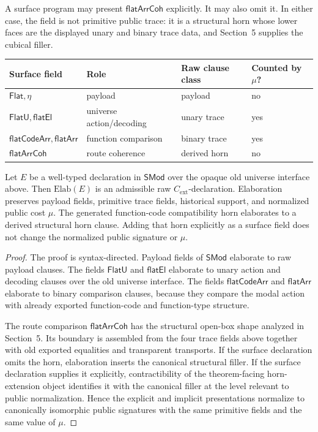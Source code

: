 A surface program may present \(\mathsf{flatArrCoh}\) explicitly.  It may also omit it.  In
either case, the field is not primitive public trace: it is a structural horn whose lower faces
are the displayed unary and binary trace data, and Section~5 supplies the cubical filler.

\begin{center}
\begin{tabular}{llll}
\hline
Surface field & Role & Raw clause class & Counted by \(\mu\)? \\
\hline
\(\mathsf{Flat},\eta\) & payload & payload & no \\
\(\mathsf{FlatU},\mathsf{flatEl}\) & universe action/decoding & unary trace & yes \\
\(\mathsf{flatCodeArr},\mathsf{flatArr}\) & function comparison & binary trace & yes \\
\(\mathsf{flatArrCoh}\) & route coherence & derived horn & no \\
\hline
\end{tabular}
\end{center}

\begin{theorem}
Let \(E\) be a well-typed declaration in \(\mathsf{SMod}\) over the opaque old universe
interface above.  Then \(\mathrm{Elab}(E)\) is an admissible raw
\(C_{\mathrm{ext}}\)-declaration.  Elaboration preserves payload fields, primitive trace
fields, historical support, and normalized public cost \(\mu\).  The generated
function-code compatibility horn elaborates to a derived structural horn clause.  Adding
that horn explicitly as a surface field does not change the normalized public signature or
\(\mu\).
\end{theorem}

\begin{proof}
The proof is syntax-directed.  Payload fields of \(\mathsf{SMod}\) elaborate to raw payload
clauses.  The fields \(\mathsf{FlatU}\) and \(\mathsf{flatEl}\) elaborate to unary action and
decoding clauses over the old universe interface.  The fields \(\mathsf{flatCodeArr}\) and
\(\mathsf{flatArr}\) elaborate to binary comparison clauses, because they compare the modal
action with already exported function-code and function-type structure.

The route comparison \(\mathsf{flatArrCoh}\) has the structural open-box shape analyzed in
Section~5.  Its boundary is assembled from the four trace fields above together with old
exported equalities and transparent transports.  If the surface declaration omits the horn,
elaboration inserts the canonical structural filler.  If the surface declaration supplies it
explicitly, contractibility of the theorem-facing horn-extension object identifies it with the
canonical filler at the level relevant to public normalization.  Hence the explicit and implicit
presentations normalize to canonically isomorphic public signatures with the same primitive
fields and the same value of \(\mu\).
\end{proof}

